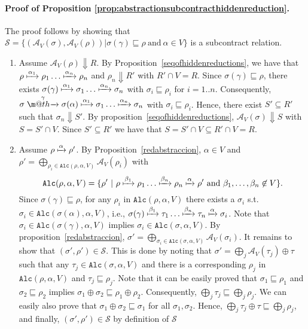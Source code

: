 \documentclass[submission,copyright,creativecommons]{eptcs}
\makeatletter
\newcommand{\tr}[1]{\stackrel{#1}{\rightarrowfill}}
\def \rightarrowfill{\m@th\mathord{\smash-}\mkern-6mu\cleaders\hbox{$\mkern-2mu\mathord{\smash-}\mkern-2mu$}\hfill
  \mkern-6mu\mathord\rightarrow}
\makeatother
\begin{document}
\paragraph{Proof of Proposition \ref{prop:abstractionsubcontracthiddenreduction}.}
The proof follows by showing that $\mathcal{S}= \{(\mathcal{A}_V(\sigma),\mathcal{A}_V(\rho)) | \sigma(\gamma) \sqsubseteq \rho \ \mbox{and}\ \alpha\in V\}$ 
is a subcontract relation. 
\begin{enumerate}
 \item Assume $\mathcal{A}_V(\rho) \Downarrow R$. By Proposition~\ref{seqofhiddenreductions}, we have that
 $\rho\xmapsto{\alpha_1}\rho_1\ldots\xmapsto{\alpha_n}\rho_n$ and $\rho_n\Downarrow R'$ with $R'\cap V = R$.
 Since  $\sigma(\gamma) \sqsubseteq \rho$, there exists 
 $\sigma(\gamma)\xmapsto{\alpha_1}\sigma_1\ldots\xmapsto{\alpha_n}\sigma_n$ with $\sigma_i \sqsubseteq \rho_i$ for $i= 1..n$.
 Consequently, $\sigma\tr{\gamma}\sigma(\alpha)\xmapsto{\alpha_1}\sigma_1\ldots\xmapsto{\alpha_n}\sigma_n$ with $\sigma_i \sqsubseteq \rho_i$.
 Hence, there exist $S'\subseteq R'$ such that $\sigma_n\Downarrow S'$. By proposition~\ref{seqofhiddenreductions},
 $\mathcal{A}_V(\sigma) \Downarrow S$ with $S=S'\cap V$. Since $S'\subseteq R'$ we have that $S = S'\cap V \subseteq R'\cap V = R$.
 
 \item Assume $\rho\xmapsto{\alpha}\rho'$. By Proposition~\ref{redabstraccion},   
  $\alpha\in V$ and $\rho' = \bigoplus_{\rho_i\in \mathtt{Alc}(\rho,\alpha,V)} \mathcal{A}_V(\rho_i)$ with
 \[\mathtt{Alc}(\rho,\alpha,V) = \{\rho'\ |\ \rho\xmapsto{\beta_1}\rho_1\ldots\xmapsto{\beta_n}\rho_n\xmapsto{\alpha}\rho'\ \mbox{and}\ \beta_1,\ldots,\beta_n\not\in V\}.\] 
 Since $\sigma(\gamma) \sqsubseteq \rho$, for any $\rho_i$ in $\mathtt{Alc}(\rho,\alpha,V)$ there exists 
 a $\sigma_i$ s.t. $\sigma_i\in\mathtt{Alc}(\sigma(\alpha),\alpha,V)$, i.e., $\sigma(\gamma)\xmapsto{\beta_1}\tau_1\ldots\xmapsto{\beta_n}\tau_n\xmapsto{\alpha}\sigma_i$. 
 Note that $\sigma_i \in\mathtt{Alc}(\sigma(\gamma),\alpha,V)$ implies $\sigma_i \in\mathtt{Alc}(\sigma,\alpha,V)$.
 By proposition~\ref{redabstraccion},
 $\sigma'= \bigoplus_{\sigma_i\in\mathtt{Alc}(\sigma,\alpha,V)} \mathcal{A}_V(\sigma_i)$.
 It remains to show that $(\sigma', \rho')\in \mathcal{S}$. This is done by noting that
 $\sigma' = \bigoplus_j\mathcal{A}_V(\tau_j) \oplus  \tau$ such that any $\tau_j \in \mathtt{Alc}(\sigma,\alpha,V)$ 
 and there is a corresponding $\rho_j$ in $\mathtt{Alc}(\rho,\alpha,V)$ and $\tau_j\sqsubseteq \rho_j$. Note that it can be easily proved that $\sigma_1 \sqsubseteq \rho_1$ and $\sigma_2 \sqsubseteq \rho_2$ implies $\sigma_1\oplus\sigma_2 \sqsubseteq\rho_1\oplus \rho_2$. Consequently,
 $\bigoplus_j \tau_j \sqsubseteq \bigoplus_j\rho_j$. We can easily also prove that $\sigma_1\oplus \sigma_2\sqsubseteq \sigma_1$ for all 
 $\sigma_1, \sigma_2$. Hence, $\bigoplus_j \tau_j \oplus \tau \sqsubseteq \bigoplus_j\rho_j$, and finally, $(\sigma',\rho')\in\mathcal{S}$ by definition of $\mathcal{S}$
\end{enumerate}
\end{document}
